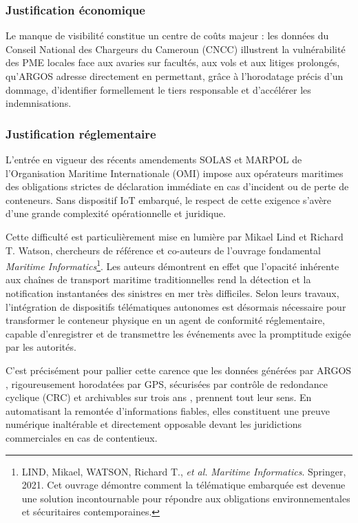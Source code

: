 \subsubsection*{Justification économique}
Le manque de visibilité constitue un centre de coûts majeur : les données du Conseil National des Chargeurs du Cameroun (CNCC) illustrent la vulnérabilité des PME locales face aux avaries sur facultés, aux vols et aux litiges prolongés, qu'ARGOS adresse directement en permettant, grâce à l'horodatage précis d'un dommage, d'identifier formellement le tiers responsable et d'accélérer les indemnisations\cite{cncc2025}.

\subsubsection*{Justification réglementaire}

L'entrée en vigueur des récents amendements SOLAS et MARPOL de l'Organisation Maritime Internationale (OMI) impose aux opérateurs maritimes des obligations strictes de déclaration immédiate en cas d'incident ou de perte de conteneurs\cite{omi2026}. Sans dispositif IoT embarqué, le respect de cette exigence s'avère d'une grande complexité opérationnelle et juridique. 

Cette difficulté est particulièrement mise en lumière par Mikael Lind et Richard T. Watson, chercheurs de référence et co-auteurs de l'ouvrage fondamental \textit{Maritime Informatics}\footnote{LIND, Mikael, WATSON, Richard T., \textit{et al.} \textit{Maritime Informatics}. Springer, 2021. Cet ouvrage démontre comment la télématique embarquée est devenue une solution incontournable pour répondre aux obligations environnementales et sécuritaires contemporaines.}. Les auteurs démontrent en effet que l'opacité inhérente aux chaînes de transport maritime traditionnelles rend la détection et la notification instantanées des sinistres en mer très difficiles. Selon leurs travaux, l'intégration de dispositifs télématiques autonomes est désormais nécessaire pour transformer le conteneur physique en un agent de conformité réglementaire, capable d'enregistrer et de transmettre les événements avec la promptitude exigée par les autorités.

C'est précisément pour pallier cette carence que les données générées par ARGOS , rigoureusement horodatées par GPS, sécurisées par contrôle de redondance cyclique (CRC) et archivables sur trois ans , prennent tout leur sens. En automatisant la remontée d'informations fiables, elles constituent une preuve numérique inaltérable et directement opposable devant les juridictions commerciales en cas de contentieux.

